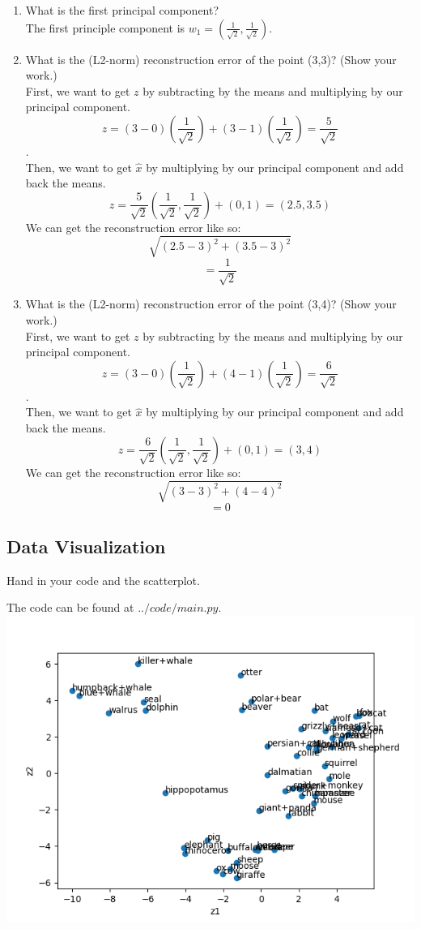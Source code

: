 \documentclass{article}
\def\blu#1{{\color{blu}#1}}
\def\gre#1{{\color{gre}#1}}
\def\enum#1{\begin{enumerate}#1\end{enumerate}}
\begin{document}
\blu{
\enum{
\item What is the first principal component?
\\
\gre{
The first principle component is $w_1 = (\frac{1}{\sqrt{2}},\frac{1}{\sqrt{2}})$.
}
\item What is the (L2-norm) reconstruction error of the point (3,3)? (Show your work.)
\\
\gre{
First, we want to get $z$ by subtracting by the means and multiplying by our principal component.
$$z = (3 - 0)(\frac{1}{\sqrt{2}}) + (3 - 1)(\frac{1}{\sqrt{2}}) = \frac{5}{\sqrt{2}}$$.
\\
Then, we want to get $\hat{x}$ by multiplying by our principal component and add back the means.
$$z = \frac{5}{\sqrt{2}}(\frac{1}{\sqrt{2}},\frac{1}{\sqrt{2}}) + (0, 1) = (2.5, 3.5)$$
We can get the reconstruction error like so:
$$\sqrt{(2.5 - 3)^2 + (3.5 - 3)^2}$$
$$= \frac{1}{\sqrt{2}}$$
}
\item What is the (L2-norm) reconstruction error of the point (3,4)? (Show your work.)
\\
\gre{
First, we want to get $z$ by subtracting by the means and multiplying by our principal component.
$$z = (3 - 0)(\frac{1}{\sqrt{2}}) + (4 - 1)(\frac{1}{\sqrt{2}}) = \frac{6}{\sqrt{2}}$$.
\\
Then, we want to get $\hat{x}$ by multiplying by our principal component and add back the means.
$$z = \frac{6}{\sqrt{2}}(\frac{1}{\sqrt{2}},\frac{1}{\sqrt{2}}) + (0, 1) = (3, 4)$$
We can get the reconstruction error like so:
$$\sqrt{(3 - 3)^2 + (4 - 4)^2}$$
$$= 0$$
}
}
}

\subsection{Data Visualization}

\blu{Hand in your code and the scatterplot}.

\gre{
The code can be found at $../code/main.py$.
\\
\includegraphics{../figs/q2_2_PCA_animals.png}
}
\end{document}
